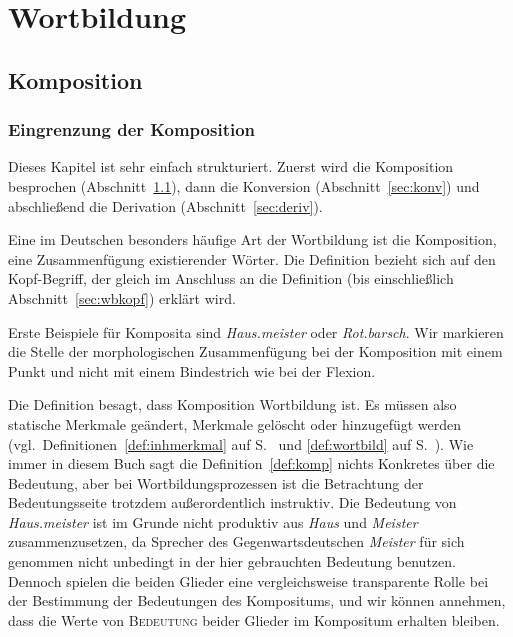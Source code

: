 \chapter{Wortbildung}

\label{sec:wortbildung}
 
\section{Komposition}

\label{sec:komp}

\subsection{Eingrenzung der Komposition}

Dieses Kapitel ist sehr einfach strukturiert.
Zuerst wird die Komposition besprochen (Abschnitt~\ref{sec:komp}), dann die Konversion (Abschnitt~\ref{sec:konv}) und abschließend die Derivation (Abschnitt~\ref{sec:deriv}).

Eine im Deutschen besonders häufige Art der Wortbildung ist die Komposition, eine Zusammenfügung existierender Wörter.
Die Definition bezieht sich auf den Kopf-Begriff, der gleich im Anschluss an die Definition (bis einschließlich Abschnitt~\ref{sec:wbkopf}) erklärt wird.


Erste Beispiele für Komposita sind \textit{Haus.meister} oder \textit{Rot.barsch}.
Wir markieren die Stelle der morphologischen Zusammenfügung bei der Komposition mit einem Punkt und nicht mit einem Bindestrich wie bei der Flexion.

\enlargethispage{1\baselineskip}
Die Definition besagt, dass Komposition Wortbildung ist.
Es müssen also statische Merkmale geändert, Merkmale gelöscht oder hinzugefügt werden (vgl.\ Definitionen~\ref{def:inhmerkmal} auf S.~\pageref{def:inhmerkmal} und \ref{def:wortbild} auf S.~\pageref{def:wortbild}).
Wie immer in diesem Buch sagt die Definition~\ref{def:komp} nichts Konkretes über die Bedeutung, aber bei Wortbildungsprozessen ist die Betrachtung der Bedeutungsseite trotzdem außerordentlich instruktiv.
Die Bedeutung von \textit{Haus.meister} ist im Grunde nicht produktiv aus \textit{Haus} und \textit{Meister} zusammenzusetzen, da Sprecher des Gegenwartsdeutschen \textit{Meister} für sich genommen nicht unbedingt in der hier gebrauchten Bedeutung benutzen.
Dennoch spielen die beiden Glieder eine vergleichsweise transparente Rolle bei der Bestimmung der Bedeutungen des Kompositums, und wir können annehmen, dass die Werte von \textsc{Bedeutung} beider Glieder im Kompositum erhalten bleiben.

